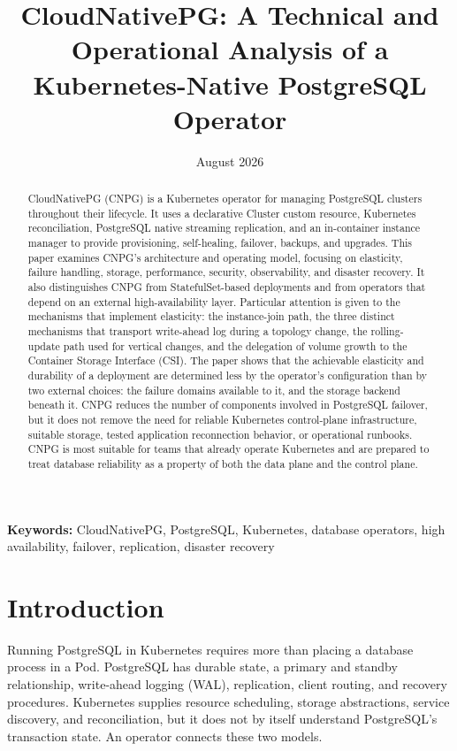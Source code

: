 \documentclass[11pt,a4paper]{article}
\title{CloudNativePG: A Technical and Operational Analysis of a Kubernetes-Native PostgreSQL Operator}
\author{ }
\date{August 2026}
\begin{document}
\maketitle

\begin{abstract}
CloudNativePG (CNPG) is a Kubernetes operator for managing PostgreSQL clusters throughout their lifecycle. It uses a declarative Cluster custom resource, Kubernetes reconciliation, PostgreSQL native streaming replication, and an in-container instance manager to provide provisioning, self-healing, failover, backups, and upgrades. This paper examines CNPG's architecture and operating model, focusing on elasticity, failure handling, storage, performance, security, observability, and disaster recovery. It also distinguishes CNPG from StatefulSet-based deployments and from operators that depend on an external high-availability layer. Particular attention is given to the mechanisms that implement elasticity: the instance-join path, the three distinct mechanisms that transport write-ahead log during a topology change, the rolling-update path used for vertical changes, and the delegation of volume growth to the Container Storage Interface (CSI). The paper shows that the achievable elasticity and durability of a deployment are determined less by the operator's configuration than by two external choices: the failure domains available to it, and the storage backend beneath it. CNPG reduces the number of components involved in PostgreSQL failover, but it does not remove the need for reliable Kubernetes control-plane infrastructure, suitable storage, tested application reconnection behavior, or operational runbooks. CNPG is most suitable for teams that already operate Kubernetes and are prepared to treat database reliability as a property of both the data plane and the control plane.
\end{abstract}

\noindent\textbf{Keywords:} CloudNativePG, PostgreSQL, Kubernetes, database operators, high availability, failover, replication, disaster recovery

\section{Introduction}

Running PostgreSQL in Kubernetes requires more than placing a database process in a Pod. PostgreSQL has durable state, a primary and standby relationship, write-ahead logging (WAL), replication, client routing, and recovery procedures. Kubernetes supplies resource scheduling, storage abstractions, service discovery, and reconciliation, but it does not by itself understand PostgreSQL's transaction state. An operator connects these two models.
\end{document}
